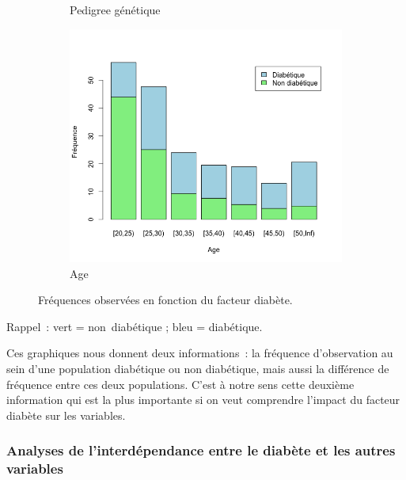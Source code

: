 \documentclass[a4paper,10pt]{report}
\begin{document}
\begin{figure}[H]
\begin{subfigure}[b]{0.25\linewidth}
		\caption{\scriptsize Pedigree génétique}
		\label{fig:1-3-2-barplot-freq-diabete-pedigree}
	\end{subfigure}%
	\begin{subfigure}[b]{0.25\linewidth}
		\centering
		\captionsetup{justification=centering}
		\includegraphics[width=1\linewidth]{img/1-3-2-barplot-freq-diabete-age}
		\caption{\scriptsize Age}
		\label{fig:1-3-2-barplot-freq-diabete-age}
	\end{subfigure}%
	\caption{
		\small Fréquences observées en fonction du facteur diabète.
	}
	\label{fig:bar_plot_freq_diabete_pima}%
\end{figure}


Rappel~: vert = non\ diabétique ; bleu = diabétique.

Ces graphiques nous donnent deux informations~: la fréquence d'observation au sein d'une population diabétique ou non diabétique, mais aussi la différence de fréquence entre ces deux populations. C'est à notre sens cette deuxième information qui est la plus importante si on veut comprendre l'impact du facteur diabète sur les variables.

\subsubsection{Analyses de l'interdépendance entre le diabète et les autres variables}
\end{document}
